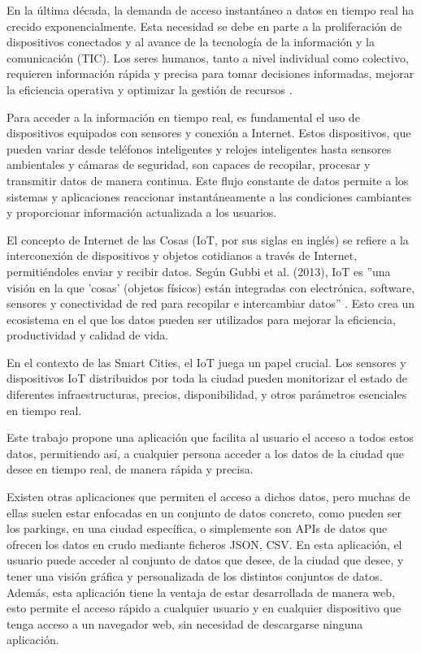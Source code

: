 \begin{comment}
Descripción del contenido del trabajo y del estructura de la memoria y del resto de materiales entregados.
\end{comment}

En la última década, la demanda de acceso instantáneo a datos en tiempo real ha crecido exponencialmente. Esta necesidad se debe en parte a la proliferación de dispositivos conectados y al avance de la tecnología de la información y la comunicación (TIC). Los seres humanos, tanto a nivel individual como colectivo, requieren información rápida y precisa para tomar decisiones informadas, mejorar la eficiencia operativa y optimizar la gestión de recursos \cite{khajeh2020, patel2016, gubbi2013}.

Para acceder a la información en tiempo real, es fundamental el uso de dispositivos equipados con sensores y conexión a Internet. Estos dispositivos, que pueden variar desde teléfonos inteligentes y relojes inteligentes hasta sensores ambientales y cámaras de seguridad, son capaces de recopilar, procesar y transmitir datos de manera continua. Este flujo constante de datos permite a los sistemas y aplicaciones reaccionar instantáneamente a las condiciones cambiantes y proporcionar información actualizada a los usuarios.

El concepto de Internet de las Cosas (IoT, por sus siglas en inglés) se refiere a la interconexión de dispositivos y objetos cotidianos a través de Internet, permitiéndoles enviar y recibir datos. Según Gubbi et al. (2013), IoT es ''una visión en la que 'cosas' (objetos físicos) están integradas con electrónica, software, sensores y conectividad de red para recopilar e intercambiar datos'' \cite{gubbi2013}. Esto crea un ecosistema en el que los datos pueden ser utilizados para mejorar la eficiencia, productividad y calidad de vida.

En el contexto de las Smart Cities, el IoT juega un papel crucial. Los sensores y dispositivos IoT distribuidos por toda la ciudad pueden monitorizar el estado de diferentes infraestructuras, precios, disponibilidad, y otros parámetros esenciales en tiempo real.

Este trabajo propone una aplicación que facilita al usuario el acceso a todos estos datos, permitiendo así, a cualquier persona acceder a los datos de la ciudad que desee en tiempo real, de manera rápida y precisa. 

Existen otras aplicaciones que permiten el acceso a dichos datos, pero muchas de ellas suelen estar enfocadas en un conjunto de datos concreto, como pueden ser los parkings, en una ciudad específica, o simplemente son APIs de datos que ofrecen los datos en crudo mediante ficheros JSON, CSV.
En esta aplicación, el usuario puede acceder al conjunto de datos que desee, de la ciudad que desee, y tener una visión gráfica y personalizada de los distintos conjuntos de datos. Además, esta aplicación tiene la ventaja de estar desarrollada de manera web, esto permite el acceso rápido a cualquier usuario y en cualquier dispositivo que tenga acceso a un navegador web, sin necesidad de descargarse ninguna aplicación.

